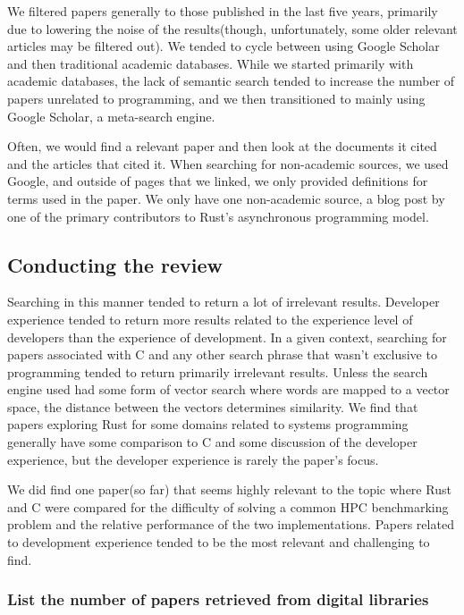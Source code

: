 \documentclass[conference]{IEEEtran}
\begin{document}
We filtered papers generally to those published in the last five years, primarily due to lowering the noise of the results(though, unfortunately, some older relevant articles may be filtered out). We tended to cycle between using Google Scholar and then traditional academic databases. While we started primarily with academic databases, the
lack of semantic search tended to increase the number of papers unrelated to programming, and we then transitioned to mainly using Google Scholar, a meta-search engine.

Often, we would find a relevant paper and then look at the documents it cited and the articles that cited it. When searching for non-academic sources, we used Google, and outside of pages that we linked, we only provided definitions for terms used in the paper. We only have one non-academic source, a blog post by one of the primary contributors to Rust's asynchronous programming model.

\subsection{Conducting the review}
\label{conducted_review}

Searching in this manner tended to return a lot of irrelevant results. Developer experience tended to return more results related to the experience level of developers than the experience of development. In a given context, searching for papers associated with C and any other search phrase that wasn't exclusive to programming tended to return primarily irrelevant results. Unless the search engine used had some form of vector search where words are mapped to a vector space, the distance between the vectors determines similarity. We find that papers exploring Rust for some domains related to systems programming generally have some comparison to C and some discussion of the developer experience, but the developer experience is rarely the paper's focus.

We did find one paper(so far) that seems highly relevant to the topic where Rust and C were compared for the difficulty of solving a common HPC benchmarking problem and the relative performance of the two implementations. Papers related to development experience tended to be the most relevant and challenging to find.

\subsubsection{List the number of papers retrieved from digital libraries}
\end{document}
